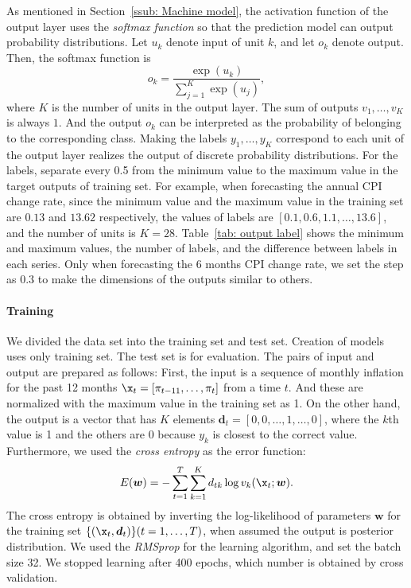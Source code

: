 \documentclass[../main.tex]{subfiles}
\begin{document}
As mentioned in Section~\ref{ssub: Machine model}, the activation function of the output layer uses the \emph{softmax function} so that the prediction model can output probability distributions.
Let $u_k$ denote input of unit $k$, and let $o_k$ denote output.
Then, the softmax function is
\begin{equation}
  o_k = \frac{\exp(u_k)}{\sum_{j=1}^K\exp(u_j)},
\end{equation}
where $K$ is the number of units in the output layer.
The sum of outputs $v_1, \dots, v_K$ is always $1$.
And the output $o_k$ can be interpreted as the probability of belonging to the corresponding class.
Making the labels $y_1, \dots, y_K$ correspond to each unit of the output layer realizes the output of discrete probability distributions.
For the labels, separate every 0.5 from the minimum value to the maximum value in the target outputs of training set.
For example, when forecasting the annual CPI change rate, since the minimum value and the maximum value in the training set are $0.13$ and $13.62$ respectively, the values of labels are $[0.1, 0.6, 1.1, \dots, 13.6]$, and the number of units is $K = 28$.
Table~\ref{tab: output label} shows the minimum and maximum values, the number of labels, and the difference between labels in each series.
Only when forecasting the 6 months CPI change rate, we set the step as $0.3$ to make the dimensions of the outputs similar to others.

\paragraph{Training}

We divided the data set into the training set and test set.
Creation of models uses only training set.
The test set is for evaluation.
The pairs of input and output are prepared as follows:
First, the input is a sequence of monthly inflation for the past 12 months $\x_t = [\pi_{t-11}, \dots, \pi_t]$ from a time $t$.
And these are normalized with the maximum value in the training set as 1.
On the other hand, the output is a vector that has $K$ elements $\bm{d}_t = [0, 0, \dots, 1, \dots, 0]$, where the $k$th value is 1 and the others are 0 because $y_k$ is closest to the correct value.
Furthermore, we used the \emph{cross entropy} as the error function:
\begin{equation}
  E(\bm{w}) = - \sum_{t=1}^T\sum_{k=1}^K d_{tk}\log v_k(\x_t;\bm{w}).
\end{equation}
The cross entropy is obtained by inverting the log-likelihood of parameters $\bm{w}$ for the training set $\{(\x_t, \bm{d}_t)\}(t = 1,\dots,T)$, when assumed the output is posterior distribution.
We used the \emph{RMSprop} for the learning algorithm, and set the batch size 32.
We stopped learning after 400 epochs, which number is obtained by cross validation.
\end{document}
